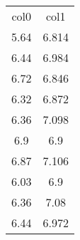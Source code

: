 \begin{table}
\begin{tabular}{cc}
col0 & col1 \\
5.64 & 6.814 \\
6.44 & 6.984 \\
6.72 & 6.846 \\
6.32 & 6.872 \\
6.36 & 7.098 \\
6.9 & 6.9 \\
6.87 & 7.106 \\
6.03 & 6.9 \\
6.36 & 7.08 \\
6.44 & 6.972 \\
\end{tabular}
\end{table}

